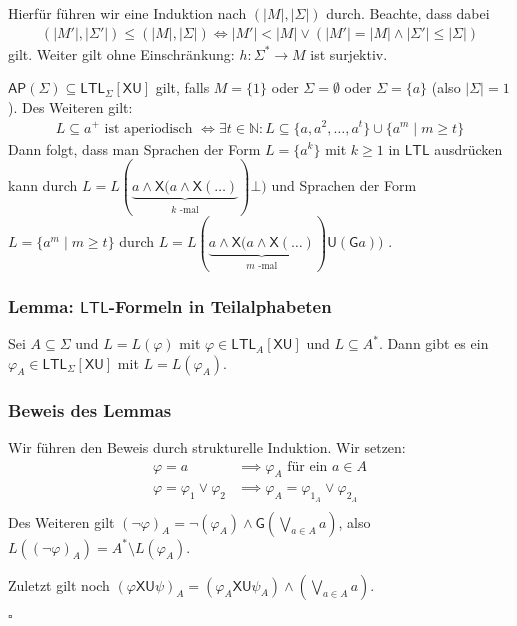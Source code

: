 \documentclass[12pt, german]{article}
\newcommand{\N}{\mathbb{N}}
\newcommand{\sigstern}{\Sigma^\ast}
\newcommand{\aast}{A^{\ast}}
\newcommand{\ap}{\mathsf{AP}}
\newcommand{\ltl}{\mathsf{LTL}}
\newcommand{\sX}{\mathsf{X}}
\newcommand{\sG}{\mathsf{G}}
\newcommand{\sU}{\mathsf{U}}
\newcommand{\bewiesen}{
	
	\begin{flushright}
		$\square$  \\
\end{flushright}}
\begin{document}
 Hierfür führen wir eine Induktion nach $(|M|,|\Sigma|)$ durch.
 Beachte, dass dabei 
 \begin{align*}
	 (|M'|,|\Sigma'|) \leq (|M|,|\Sigma|) \iff  |M'|<|M| \lor (|M'|=|M| \land |\Sigma'|\leq |\Sigma|)
 \end{align*}
 gilt. Weiter gilt ohne Einschränkung: $h:\sigstern \to M$ ist surjektiv. \newline
 
 $\ap(\Sigma) \subseteq \ltl_\Sigma[\sX\sU] $ gilt, falls $M=\{1\}$ oder $\Sigma = \emptyset$ oder $\Sigma = \{a\}$ (also $|\Sigma| = 1$).
 Des Weiteren gilt: 
 	\begin{align*}
 		L \subseteq a^+ \text{ ist aperiodisch } \iff \exists t \in \N: L \subseteq \{a, a^2, \ldots, a^t\} \cup \{a^m \mid  m \geq t\}
 	\end{align*}
 Dann folgt, dass man Sprachen der Form $L=\{a^k\}$ mit $k \geq 1$ in $\ltl$ ausdrücken kann durch $L = L(\underbrace{a \land \sX(a \land \sX(\ldots)}_{\substack{k\text{ -mal}}})\bot)$ und Sprachen der Form $L=\{a^m \mid m \geq t\}$ durch $L = L(\underbrace{a \land \sX(a \land \sX(\ldots)}_{\substack{m\text{ -mal}}})\sU(\sG a))$ .
 	
\subsubsection{Lemma: $\ltl$-Formeln in Teilalphabeten}
 \label{sec:teilalphabet_ltl}
	Sei $A\subseteq \Sigma$ und $L = L(\varphi)$ mit $\varphi \in \ltl_A[\sX\sU]$ und $L \subseteq \aast$. Dann gibt es ein $\varphi_A \in \ltl_\Sigma[\sX\sU]$ mit $L=L(\varphi_A)$.

\subsubsection{Beweis des Lemmas}
	Wir führen den Beweis durch strukturelle Induktion.
	Wir setzen:
	\begin{align*}
		\varphi = a &\implies\varphi_A \text{ für ein } a \in A \\
		\varphi = \varphi_{1} \lor \varphi_{2} &\implies \varphi_{A} = \varphi_{1_A} \lor \varphi_{2_A} \\
	\end{align*} 
	Des Weiteren gilt $(\neg \varphi)_A = \neg (\varphi_{A}) \land \sG(\bigvee_{a \in A}a)$, also $L((\neg\varphi)_A) = \aast \setminus L(\varphi_{A})$.\newline
	
	Zuletzt gilt noch $(\varphi \sX \sU \psi)_A = (\varphi_{A} \sX \sU \psi_A) \land (\bigvee_{a \in A} a)$.
	\bewiesen
	
\end{document}
